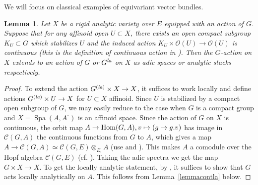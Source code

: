 \documentclass[a4paper,10pt]{amsart}
\theoremstyle{remark}
\theoremstyle{definition}
\theoremstyle{plain}
\newtheorem{lemma}[theorem]{Lemma}
\numberwithin{equation}{section}
\newcommand{\calC}{{\mathcal C}}
\newcommand{\calO}{{\mathcal O}}
\newcommand{\Hom}{{\rm Hom}}
\newcommand{\la}{{\it la}}
\DeclareMathOperator{\Spa}{Spa}
\begin{document}
We will focus on classical examples of equivariant vector bundles. 
\begin{lemma}\label{lemmaecontinuousactionrigid}
	Let $X$ be a rigid analytic variety over $E$ equipped with an action of $G$. Suppose that for any affinoid open $U\subset X$, there exists an open compact subgroup $K_U\subset G$ which stabilizes $U$ and the induced action $K_U\times \calO(U)\rightarrow \calO(U)$ is continuous (this is the definition of continuous action in \cite[Def.~2.1, Lem.~2.2]{scholze2018lubintate}).  Then the $G$-action on $X$ extends to an action of $G$ or $G^{\la}$ on $X$ as adic spaces or analytic stacks respectively.
\end{lemma}
\begin{proof}
	To extend the action $G^{(\la)}\times X\rightarrow X$, it suffices to work locally and define actions $ G^{(\la)}\times U\rightarrow X$ for $U\subset X$ affinoid. Since $U$ is stabilized by a compact open subgroup of $G$, we may easily reduce to the case when $G$ is a compact group and $X=\Spa(A,A^{\circ})$ is an affinoid space. Since the action of $G$ on $X$ is continuous, the orbit map $A\rightarrow \Hom(G,A), v\mapsto (g\mapsto g.v)$ has image in $\calC(G,A)$ the continuous functions from $G$ to $A$, which gives a map $A\rightarrow \calC(G,A)\simeq \calC(G,E)\otimes_{E_{\square}}A$ (use \cite[(2.1.3)]{emerton2017locally} and \cite[Lem.~3.13]{rodrigues2022solid}). This makes $A$ a comodule over the Hopf algebra $\calC(G,E)$ (cf. \cite[Lem.~6.1.3]{JC23}). Taking the adic spectra we get the map $G\times X\rightarrow X$. To get the locally analytic statement, by \cite[Lem.~4.3.4]{JC23}, it suffices to show that $G$ acts locally analytically on $A$. This follows from Lemma~\ref{lemmacontla} below.
\end{proof}
\end{document}
